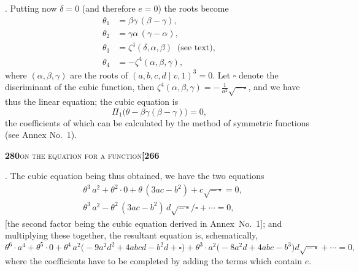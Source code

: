 \documentclass[11pt]{article}
\newcommand{\Cdel}{\mid}
\begin{document}
\medskip

. Putting now $\delta = 0$ (and therefore $e = 0$) the roots become
\[
\begin{aligned}
   \theta_1 &=  \beta\gamma\,(\beta - \gamma),\\
   \theta_2 &=  \gamma\alpha\,(\gamma - \alpha),\\
   \theta_3 &= \zeta^4(\delta, \alpha, \beta) \;\;\text{(see text)},\\
   \theta_4 &= -\zeta^4(\alpha, \beta, \gamma),
\end{aligned}
\]
where $(\alpha, \beta, \gamma)$ are the roots of $(a, b, c, d \Cdel v, 1)^3 = 0$. Let $\square$ denote the discriminant of the cubic function, then $\zeta^4(\alpha, \beta, \gamma) = -\,\tfrac{1}{a^2}\sqrt{-\,\square}$, and we have thus the linear equation; the cubic equation is
\[
   \Pi_1\bigl(\theta - \beta\gamma(\beta - \gamma)\bigr) = 0,
\]
the coefficients of which can be calculated by the method of symmetric functions (see Annex No.~1).

\newpage
\setcounter{page}{280}

\noindent\textbf{280}\hfill\textsc{on the equation for a function}\hfill\textbf{[266}

\medskip

. The cubic equation being thus obtained, we have the two equations
\[
\begin{aligned}
   & \theta^3\,a^2 + \theta^2\cdot 0 + \theta\,(3ac - b^2) + c\sqrt{-\,\square} = 0,\\[2pt]
   & \theta^3\,a^2 - \theta^2\,(3ac - b^2)\,d\sqrt{-\,\square}/\square + \cdots = 0,
\end{aligned}
\]
[the second factor being the cubic equation derived in Annex~No.~1]; and multiplying these together, the resultant equation is, schematically,
\[
\theta^6\cdot a^4 + \theta^5\cdot 0 + \theta^4\,a^2\bigl(-9a^2 d^2 + 4abcd - b^2 d + \square\bigr) + \theta^3\cdot a^2\bigl(-8a^2 d + 4abc - b^3\bigr) d \sqrt{-\,\square} + \cdots = 0,
\]
where the coefficients have to be completed by adding the terms which contain $e$.

\medskip
\end{document}
